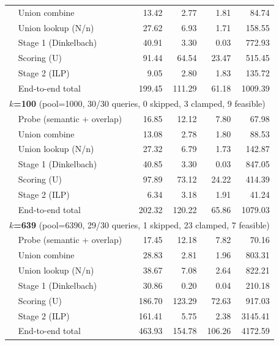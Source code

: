 \begin{longtable}{llrrrr}
 & Union combine & 13.42 & 2.77 & 1.81 & 84.74 \\
 & Union lookup (N/n) & 27.62 & 6.93 & 1.71 & 158.55 \\
 & Stage 1 (Dinkelbach)\tnote{b} & 40.91 & 3.30 & 0.03 & 772.93 \\
 & Scoring (U) & 91.44 & 64.54 & 23.47 & 515.45 \\
 & Stage 2 (ILP)\tnote{b} & 9.05 & 2.80 & 1.83 & 135.72 \\
 & End-to-end total & 199.45 & 111.29 & 61.18 & 1009.39 \\
\midrule
\multicolumn{6}{l}{\textbf{$k$=100} (pool=1000, 30/30 queries, 0 skipped, 3 clamped, 9 feasible)\tnote{a}} \\
 & Probe (semantic + overlap) & 16.85 & 12.12 & 7.80 & 67.98 \\
 & Union combine & 13.08 & 2.78 & 1.80 & 88.53 \\
 & Union lookup (N/n) & 27.32 & 6.79 & 1.73 & 142.87 \\
 & Stage 1 (Dinkelbach)\tnote{b} & 40.85 & 3.30 & 0.03 & 847.05 \\
 & Scoring (U) & 97.89 & 73.12 & 24.22 & 414.39 \\
 & Stage 2 (ILP)\tnote{b} & 6.34 & 3.18 & 1.91 & 41.24 \\
 & End-to-end total & 202.32 & 120.22 & 65.86 & 1079.03 \\
\midrule
\multicolumn{6}{l}{\textbf{$k$=639} (pool=6390, 29/30 queries, 1 skipped, 23 clamped, 7 feasible)\tnote{a}} \\
 & Probe (semantic + overlap) & 17.45 & 12.18 & 7.82 & 70.16 \\
 & Union combine & 28.83 & 2.81 & 1.96 & 803.31 \\
 & Union lookup (N/n) & 38.67 & 7.08 & 2.64 & 822.21 \\
 & Stage 1 (Dinkelbach)\tnote{b} & 30.86 & 0.20 & 0.04 & 210.18 \\
 & Scoring (U) & 186.70 & 123.29 & 72.63 & 917.03 \\
 & Stage 2 (ILP)\tnote{b} & 161.41 & 5.75 & 2.38 & 3145.41 \\
 & End-to-end total & 463.93 & 154.78 & 106.26 & 4172.59 \\
\midrule
\end{longtable}
